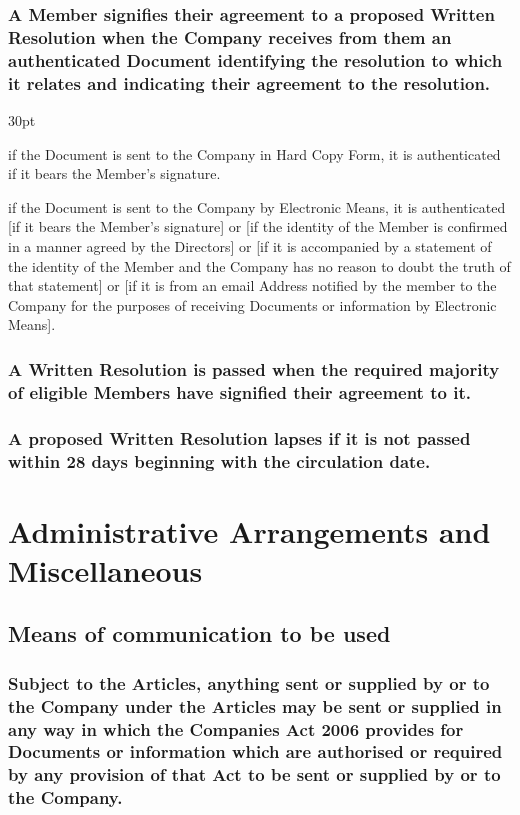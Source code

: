\documentclass[12pt]{article}
\def\clauseindent{30pt}
\newenvironment{subindentpara}{\begin{adjustwidth}{\clauseindent}{}\begin{hanginglist}}{\end{hanginglist}\end{adjustwidth}}
\begin{document}
\subsubsection[Responses to Written Resolutions]{A Member signifies their agreement to a proposed Written Resolution when the Company receives from them an authenticated Document identifying the resolution to which it relates and indicating their agreement to the resolution.}
\begin{subindentpara}
    \item if the Document is sent to the Company in Hard Copy Form, it is authenticated if it bears the Member's signature.
    \item if the Document is sent to the Company by Electronic Means, it is authenticated [if it bears the Member's signature] or [if the identity of the Member is confirmed in a manner agreed by the Directors] or [if it is accompanied by a statement of the identity of the Member and the Company has no reason to doubt the truth of that statement] or [if it is from an email Address notified by the member to the Company for the purposes of receiving Documents or information by Electronic Means].
\end{subindentpara}
\subsubsection[Passing of Written Resolutions]{A Written Resolution is passed when the required majority of eligible Members have signified their agreement to it.}
\subsubsection[Lapsing of Written Resolutions]{A proposed Written Resolution lapses if it is not passed within 28 days beginning with the circulation date.}

\section*{Administrative Arrangements and Miscellaneous}

\subsection{Means of communication to be used}
\subsubsection[Specifics of communication to be used]{Subject to the Articles, anything sent or supplied by or to the Company under the Articles may be sent or supplied in any way in which the Companies Act 2006 provides for Documents or information which are authorised or required by any provision of that Act to be sent or supplied by or to the Company.}
\end{document}
